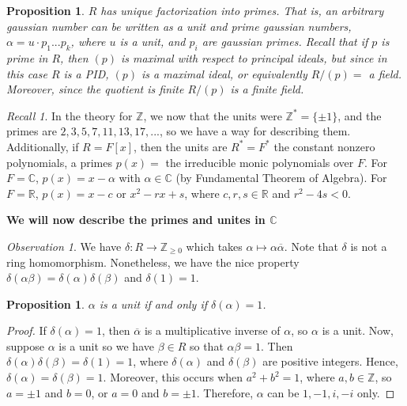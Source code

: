 \documentclass[12pt]{article}
\newtheorem{prop}[thm]{Proposition}
\theoremstyle{definition}
\theoremstyle{remark}
\newtheorem{obs}[thm]{Observation}
\newtheorem*{rec}{Recall}
\numberwithin{equation}{section}
\newcommand\C{\mathbb C}    %
\newcommand\R{\mathbb R}    %
\newcommand\Z{\mathbb Z}    %
\begin{document}
\vspace{15pt}

\begin{prop}
        $R$ has unique factorization into primes. That is, an arbitrary gaussian number can be written as a unit and prime gaussian numbers, $\alpha = u\cdot p_1...p_k$, where $u$ is a unit, and $p_i$ are gaussian primes. Recall that if $p$ is prime in $R$, then $(p)$ is maximal with respect to principal ideals, but since in this case $R$ is a PID, $(p)$ is a maximal ideal, or equivalently $R/(p) = $ a field. Moreover, since the quotient is finite $R/(p)$ is a finite field. 
\end{prop}

\vspace{15pt}

\begin{rec}
        In the theory for $\Z$, we now that the units were $\Z^* = \{\pm 1\}$, and the primes are $2,3,5,7,11,13,17,...$, so we have a way for describing them. Additionally, if $R = F[x]$, then the units are $R^* = F^*$ the constant nonzero polynomials, a primes $p(x) = $ the irreducible monic polynomials over $F$. For $F = \C$, $p(x) = x - \alpha$ with $\alpha \in \C$ (by Fundamental Theorem of Algebra). For $F = \R$, $p(x) = x-c$ or $x^2-rx+s$, where $c,r,s \in \R$ and $r^2 - 4s < 0$.
\end{rec}

\vspace{15pt}

\textbf{We will now describe the primes and unites in $\C$}

\vspace{15pt}

\begin{obs}
        We have $\delta:R\rightarrow \Z_{\geq 0}$ which takes $\alpha \mapsto \alpha\overline{\alpha}$. Note that $\delta$ is not a ring homomorphism. Nonetheless, we have the nice property $\delta(\alpha\beta) = \delta(\alpha)\delta(\beta)$ and $\delta(1) = 1$.
\end{obs}

\vspace{15pt}

\begin{prop}
        $\alpha$ is a unit if and only if $\delta(\alpha) = 1$. 
\end{prop}
\begin{proof}
        If $\delta(\alpha) = 1$, then $\overline{\alpha}$ is a multiplicative inverse of $\alpha$, so $\alpha$ is a unit. Now, suppose $\alpha$ is a unit so we have $\beta \in R$ so that $\alpha\beta = 1$. Then $\delta(\alpha)\delta(\beta) = \delta(1) = 1$, where $\delta(\alpha)$ and $\delta(\beta)$ are positive integers. Hence, $\delta(\alpha) = \delta(\beta) = 1$. Moreover, this occurs when $a^2+b^2 = 1$, where $a,b \in \Z$, so $a = \pm 1$ and $b = 0$, or $a = 0$ and $b = \pm 1$. Therefore, $\alpha$ can be $1,-1,i,-i$ only.
\end{proof}
\end{document}
